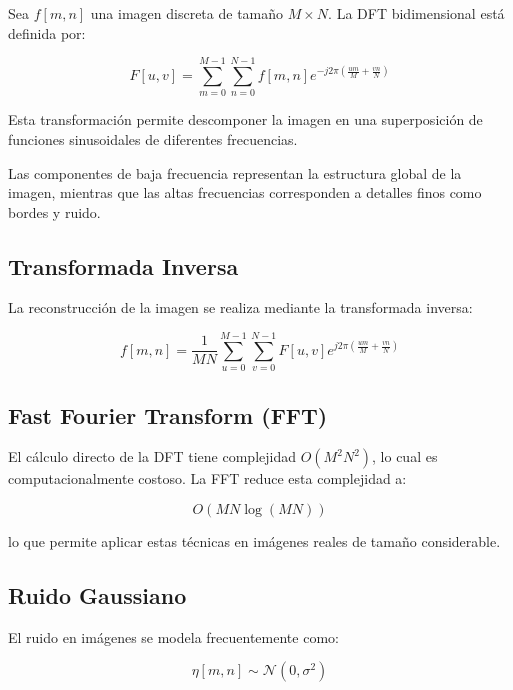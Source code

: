 \documentclass[conference]{IEEEtran}
\begin{document}
	Sea $f[m,n]$ una imagen discreta de tamaño $M \times N$. La DFT bidimensional está definida por:
	
	\begin{equation}
		F[u,v] = \sum_{m=0}^{M-1} \sum_{n=0}^{N-1} f[m,n] e^{-j2\pi\left(\frac{um}{M} + \frac{vn}{N}\right)}
	\end{equation}
	
	Esta transformación permite descomponer la imagen en una superposición de funciones sinusoidales de diferentes frecuencias.
	
	Las componentes de baja frecuencia representan la estructura global de la imagen, mientras que las altas frecuencias corresponden a detalles finos como bordes y ruido.
	
	\subsection{Transformada Inversa}
	
	La reconstrucción de la imagen se realiza mediante la transformada inversa:
	
	\begin{equation}
		f[m,n] = \frac{1}{MN} \sum_{u=0}^{M-1} \sum_{v=0}^{N-1} F[u,v] e^{j2\pi\left(\frac{um}{M} + \frac{vn}{N}\right)}
	\end{equation}
	
	\subsection{Fast Fourier Transform (FFT)}
	
	El cálculo directo de la DFT tiene complejidad $O(M^2N^2)$, lo cual es computacionalmente costoso. La FFT reduce esta complejidad a:
	
	\begin{equation}
		O(MN \log(MN))
	\end{equation}
	
	lo que permite aplicar estas técnicas en imágenes reales de tamaño considerable.
	
	\subsection{Ruido Gaussiano}
	
	El ruido en imágenes se modela frecuentemente como:
	
	\begin{equation}
		\eta[m,n] \sim \mathcal{N}(0, \sigma^2)
	\end{equation}
	
\end{document}
